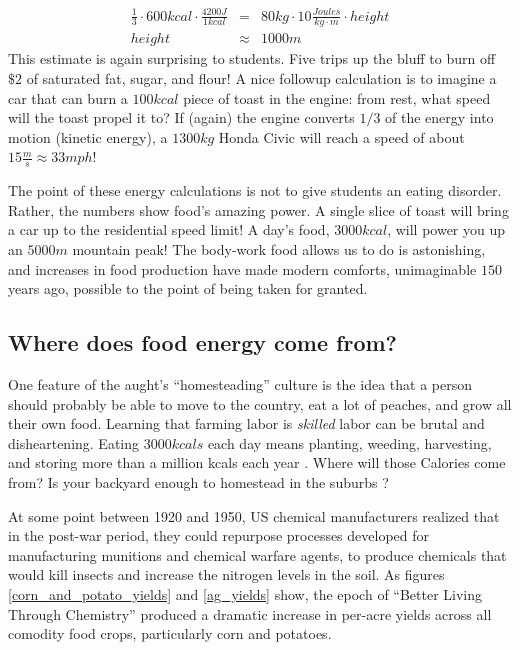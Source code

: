 \documentclass[12pt]{iopart}
\newcommand{\bea}{\begin{eqnarray}}
\newcommand{\eea}{\end{eqnarray}}
\begin{document}
\bea
\frac{1}{3}\cdot600kcal\cdot\frac{4200J}{1kcal} 
	&=& 80kg\cdot10\frac{Joules}{kg\cdot m}\cdot height \label{eq:bar_chart}\\
height &\approx&  1000 m
\eea
This estimate is again surprising to students.  Five trips up the bluff to burn off $\$2$ of saturated fat, sugar, and flour!  A nice followup calculation is to imagine a car that can burn a $100kcal$ piece of toast in the engine: from rest, what speed will the toast propel it to? If (again) the engine converts $1/3$ of the energy into motion (kinetic energy), a $1300kg$ Honda Civic will reach a speed of about $15\frac{m}{s}\approx33mph$!  

The point of these energy calculations is not to give students an eating disorder.  Rather, the numbers show food's amazing power. A single slice of toast will bring a car up to the residential speed limit!  A day's food, $3000kcal$, will power you up an $5000m$ mountain peak! The body-work food allows us to do is astonishing, and increases in food production have made modern  comforts, unimaginable $150$ years ago, possible to the point of being taken for granted.  

\clearpage

\subsection{Where does food energy come from?}
One feature of the aught's ``homesteading'' culture \cite{homesteading} is the idea that a person should probably be able to move to the country, eat a lot of peaches, and grow all their own food.  Learning that farming labor is \textit{skilled} labor can be brutal and disheartening. Eating $3000kcals$ each day means planting, weeding, harvesting, and storing more than a million kcals each year \cite{Haspel}.  Where will those Calories come from? Is your backyard enough to homestead in the suburbs \cite{backyard_homestead}?

At some point between 1920 and 1950, US chemical manufacturers realized that in the post-war period, they could repurpose processes developed for manufacturing munitions and chemical warfare agents, to produce chemicals that would kill insects and increase the nitrogen levels in the soil. 
As figures \ref{corn_and_potato_yields} and \ref{ag_yields} show, the epoch of ``Better Living Through Chemistry'' produced a dramatic increase in per-acre yields across all comodity food crops, particularly corn and potatoes.  
\end{document}
